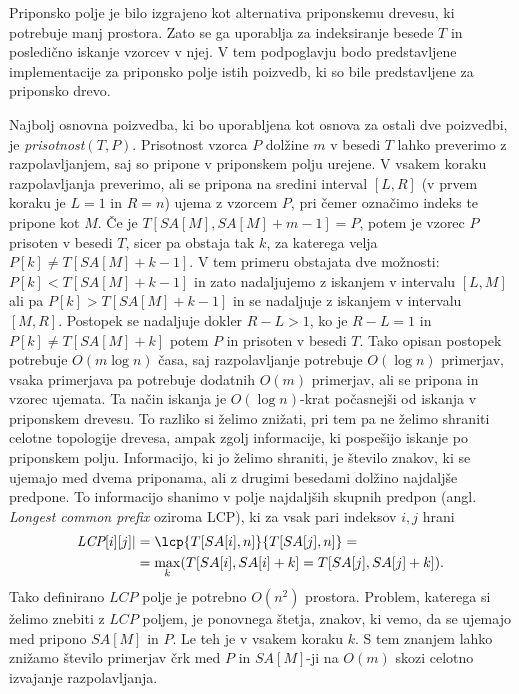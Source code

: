 Priponsko polje je bilo izgrajeno kot alternativa priponskemu drevesu, ki potrebuje manj prostora. Zato se ga uporablja za indeksiranje besede $T$ in posledično iskanje vzorcev v njej. V tem podpoglavju bodo predstavljene implementacije za priponsko polje istih poizvedb, ki so bile predstavljene za priponsko drevo.

Najbolj osnovna poizvedba, ki bo uporabljena kot osnova za ostali dve poizvedbi, je \textit{prisotnost}$(T,P)$. Prisotnost vzorca $P$ dolžine $m$ v besedi $T$ lahko preverimo z razpolavljanjem, saj so pripone v priponskem polju urejene. V vsakem koraku razpolavljanja preverimo, ali se pripona na sredini interval $[L,R]$ (v prvem koraku je $L=1$ in $R=n$) ujema z vzorcem $P$, pri čemer označimo indeks te pripone kot $M$. Če je $T[SA[M],SA[M]+m-1]=P$, potem je vzorec $P$ prisoten v besedi $T$, sicer pa obstaja tak $k$, za katerega velja $P[k]\ne T[SA[M]+k-1]$. V tem primeru obstajata dve možnosti: $P[k]<T[SA[M]+k-1]$ in zato nadaljujemo z iskanjem v intervalu $[L,M]$ ali pa $P[k]>T[SA[M]+k-1]$ in se nadaljuje z iskanjem v intervalu $[M,R]$. Postopek se nadaljuje dokler $R-L>1$, ko je $R-L=1$ in $P[k]\ne T[SA[M]+k]$ potem $P$ in prisoten v besedi $T$. Tako opisan postopek potrebuje $O(m\log{n})$ časa, saj razpolavljanje potrebuje $O(\log{n})$ primerjav, vsaka primerjava pa potrebuje dodatnih $O(m)$ primerjav, ali se pripona in vzorec ujemata. Ta način iskanja je $O(\log{n})$-krat počasnejši od iskanja v priponskem drevesu. To razliko si želimo znižati, pri tem pa ne želimo shraniti celotne topologije drevesa, ampak zgolj informacije, ki pospešijo iskanje po priponskem polju. Informacijo, ki jo želimo shraniti, je število znakov, ki se ujemajo med dvema priponama, ali z drugimi besedami dolžino najdaljše predpone. To informacijo shanimo v polje najdaljših skupnih predpon (angl. \textit{Longest common prefix} oziroma LCP), ki za vsak pari indeksov $i,j$ hrani
    \begin{equation*} 
        \begin{split}
        \textit{LCP}[i][j]|&=\lcp{T[SA[i],n]}{T[SA[j],n]}=\\
         &=\max_{k}(T[SA[i],SA[i]+k]=T[SA[j],SA[j]+k]).\\
        \end{split}
    \end{equation*}
Tako definirano $LCP$ polje je potrebno $O(n^2)$ prostora. Problem, katerega si želimo znebiti z $LCP$ poljem, je ponovnega štetja, znakov, ki vemo, da se ujemajo med pripono $SA[M]$ in $P$. Le teh je v vsakem koraku $k$. S tem znanjem lahko znižamo število primerjav črk med $P$ in $SA[M]$-ji na $O(m)$ skozi celotno izvajanje razpolavljanja. 


